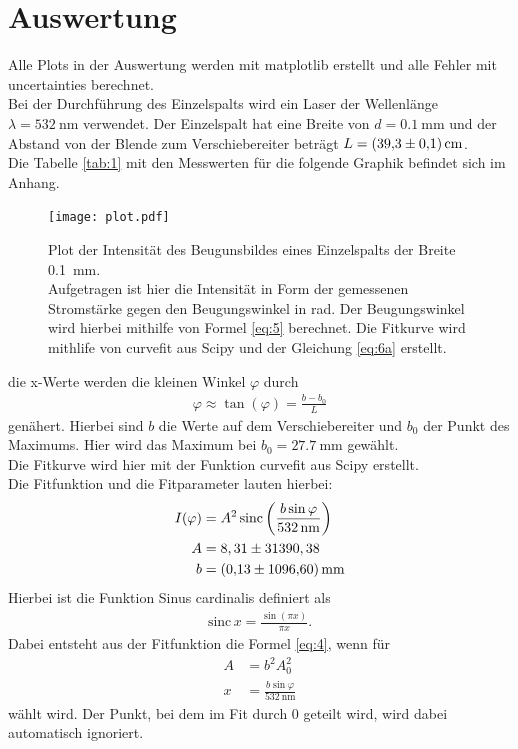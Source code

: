 \section{Auswertung}
Alle Plots in der Auswertung werden mit matplotlib \cite{matplotlib} erstellt und alle
Fehler mit uncertainties \cite{uncertainties} berechnet.\\
Bei der Durchführung des Einzelspalts wird ein Laser der Wellenlänge $\lambda = \SI{532}{\nano\meter} $ verwendet.
Der Einzelspalt hat eine Breite von $d=\SI{0.1}{\milli\meter} $ und der Abstand von 
der Blende zum Verschiebereiter beträgt $L=\SI{39.3+-0.1}{\centi\meter} $.\\
Die Tabelle \ref{tab:1} mit den Messwerten für die folgende Graphik befindet sich im Anhang.
\begin{figure}[H]
    \centering
    \texttt{[image: plot.pdf]}
    \caption{
        Plot der Intensität des Beugunsbildes eines Einzelspalts der Breite \SI{0.1}{\milli\meter}.\cite{matplotlib}\\
        Aufgetragen ist hier die Intensität in Form der gemessenen Stromstärke
        gegen den Beugungswinkel \varphi in rad. Der Beugungswinkel wird hierbei mithilfe von
        Formel \eqref{eq:5} berechnet. Die Fitkurve wird mithlife von curvefit aus Scipy \cite{scipy}
        und der Gleichung \eqref{eq:6a} erstellt. 
    } 
    \label{fig:4} 
\end{figure}
\justifying die x-Werte werden die kleinen Winkel $\varphi$ durch 
\begin{align}
    \varphi \approx \tan (\varphi) = \frac{b-b_0}{L} \label{eq:5}
\end{align}
genähert. Hierbei sind $b$ die Werte auf dem Verschiebereiter und $b_0$ der Punkt des Maximums.
Hier wird das Maximum bei $b_0= \SI{27.7}{\milli\meter} $ gewählt.\\
Die Fitkurve wird hier mit der Funktion curvefit aus Scipy \cite{scipy} erstellt.\\
Die Fitfunktion und die Fitparameter lauten hierbei:
\begin{subequations}
\begin{align}
    I(\varphi) &= A^2 \,\text{sinc} \left(\frac{b \sin{\varphi}}{\SI{532}{\nano\meter}} \right) \label{eq:6a}\\
    A &= 8,31 \pm 31390,38 \label{eq:6b}\\
    b &= \SI{0.13+-1096.6}{\milli\meter} \label{eq:6c}
\end{align}
\end{subequations}
Hierbei ist die Funktion Sinus cardinalis definiert als
\begin{align}
    \text{sinc}\,x = \frac{\sin (\pi x)}{\pi x} \label{eq:7} .
\end{align}
Dabei entsteht aus der Fitfunktion die Formel \eqref{eq:4}, wenn für
\begin{align}
    A &= b^2 A_0^2 \label{eq:8} \\
    x &= \frac{b \sin{\varphi}}{\SI{532}{\nano\meter}} \label{eq:9}
\end{align}
wählt wird.
Der Punkt, bei dem im Fit durch 0 geteilt wird, wird dabei automatisch ignoriert.



